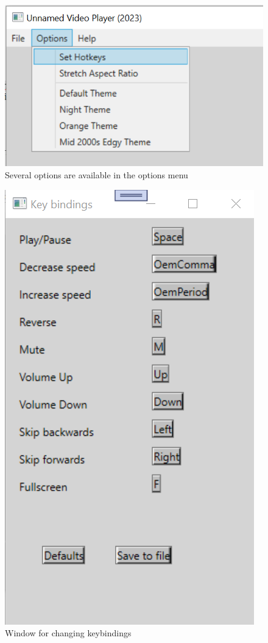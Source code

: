 \documentclass[10pt,conference,onecolumn,compsoc]{IEEEtran}
\begin{document}
\begin{figure}[H]
\begin{center}
\includegraphics[scale=.7]{OptionsInterface.png}
\caption{Several options are available in the options menu}
\label{OptionsInterface}
\end{center}
\end{figure}

\begin{figure}[H]
\begin{center}
\includegraphics[scale=.7]{KeybindingsInterface.png}
\caption{Window for changing keybindings}
\label{KeybindingsInterface}
\end{center}
\end{figure}
\end{document}
